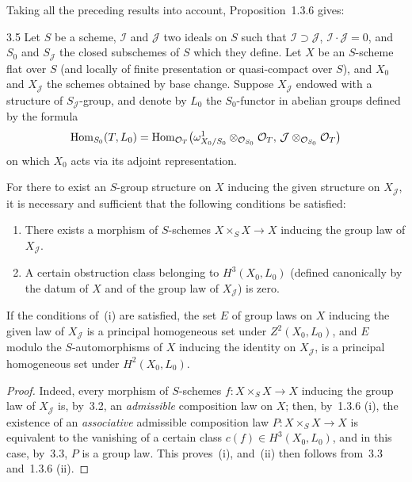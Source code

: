 Taking all the preceding results into account, Proposition~1.3.6 gives:

\begin{theorem}{3.5}\label{III.3.5}
Let \(S\) be a scheme, \(\mathcal{I}\) and \(\mathcal{J}\) two ideals on \(S\)
such that \(\mathcal{I}\supset\mathcal{J}\),
\(\mathcal{I}\cdot\mathcal{J}=0\), and \(S_{0}\) and \(S_{\mathcal{J}}\) the
closed subschemes of \(S\) which they define. Let \(X\) be an \(S\)-scheme flat
over \(S\) (and locally of finite presentation or quasi-compact over \(S\)),
and \(X_{0}\) and \(X_{\mathcal{J}}\) the schemes obtained by base change.
Suppose \(X_{\mathcal{J}}\) endowed with a structure of
\(S_{\mathcal{J}}\)-group, and denote by \(L_{0}\) the \(S_{0}\)-functor in
abelian groups defined by the formula
\[
\operatorname{Hom}_{S_{0}}(T,L_{0})
  =\operatorname{Hom}_{\mathcal{O}_{T}}\bigl(
    \omega^{1}_{X_{0}/S_{0}}\otimes_{\mathcal{O}_{S_{0}}}\mathcal{O}_{T},\,
    \mathcal{J}\otimes_{\mathcal{O}_{S_{0}}}\mathcal{O}_{T}\bigr)
\]
on which \(X_{0}\) acts via its adjoint representation.
\begin{enumeratei}
\item For there to exist an \(S\)-group structure on \(X\) inducing the given
structure on \(X_{\mathcal{J}}\), it is necessary and sufficient that the
following conditions be satisfied:
\begin{enumerate}[label={($i_{\arabic*}$)}]
\item There exists a morphism of \(S\)-schemes \(X\times_{S}X\to X\) inducing
the group law of \(X_{\mathcal{J}}\).
\item A certain obstruction class belonging to \(H^{3}(X_{0},L_{0})\) (defined
canonically by the datum of \(X\) and of the group law of \(X_{\mathcal{J}}\))
is zero.
\end{enumerate}
\item If the conditions of~(i) are satisfied, the set \(E\) of group laws on
\(X\) inducing the given law of \(X_{\mathcal{J}}\) is a principal homogeneous
set under \(Z^{2}(X_{0},L_{0})\), and \(E\) modulo the \(S\)-automorphisms of
\(X\) inducing the identity on \(X_{\mathcal{J}}\), is a principal homogeneous
set under \(H^{2}(X_{0},L_{0})\).
\end{enumeratei}
\end{theorem}

\begin{proof}
\renewcommand{\qedsymbol}{}
{\renewcommand{\thefootnote}{(69)}}
Indeed, every morphism of \(S\)-schemes \(f\colon X\times_{S}X\to X\) inducing
the group law of \(X_{\mathcal{J}}\) is, by~3.2, an \emph{admissible}
composition law on \(X\); then, by~1.3.6 (i), the existence of an
\emph{associative} admissible composition law \(P\colon X\times_{S}X\to X\) is
equivalent to the vanishing of a certain class \(c(f)\in H^{3}(X_{0},L_{0})\),
and in this case, by~3.3, \(P\) is a group law. This proves~(i), and~(ii) then
follows from~3.3 and~1.3.6 (ii).
\end{proof}

